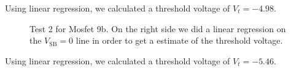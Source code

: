 \documentclass{article}
\begin{document}
Using linear regression, we calculated a threshold voltage of $V_t = -4.98$.

\begin{figure}[H]
\centering
{}
\caption{Test 2 for Mosfet 9b. On the right side we did a linear regression on the $V_{\text{SB}} = 0$ line in order to get a estimate of the threshold voltage.}
\label{fig:9blin}
\end{figure}

Using linear regression, we calculated a threshold voltage of $V_t = -5.46$.
\end{document}
